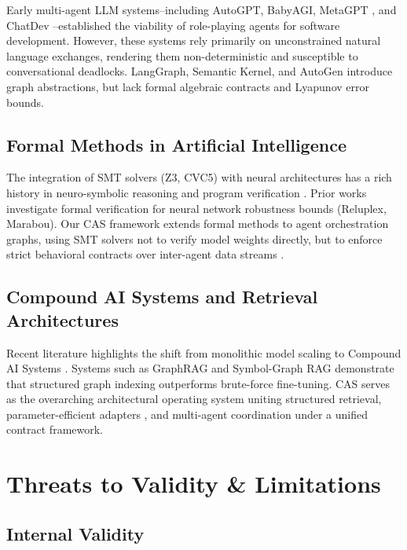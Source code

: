 \documentclass[10pt,twocolumn,letterpaper]{article}
\begin{document}
Early multi-agent LLM systems--including AutoGPT, BabyAGI, MetaGPT \cite{crossref_10_48550_arxiv_2308_00352}, and ChatDev \cite{crossref_10_18653_v1_2024_acl_long_810}--established the viability of role-playing agents for software development. However, these systems rely primarily on unconstrained natural language exchanges, rendering them non-deterministic and susceptible to conversational deadlocks. LangGraph, Semantic Kernel, and AutoGen introduce graph abstractions, but lack formal algebraic contracts and Lyapunov error bounds.


\subsection{Formal Methods in Artificial Intelligence}

The integration of SMT solvers (Z3, CVC5) with neural architectures has a rich history in neuro-symbolic reasoning and program verification \cite{crossref_10_18653_v1_2026_findings_acl_1933}. Prior works investigate formal verification for neural network robustness bounds (Reluplex, Marabou). Our CAS framework extends formal methods to agent orchestration graphs, using SMT solvers not to verify model weights directly, but to enforce strict behavioral contracts over inter-agent data streams \cite{arxiv_2404_01131}.


\subsection{Compound AI Systems and Retrieval Architectures}

Recent literature highlights the shift from monolithic model scaling to Compound AI Systems \cite{arxiv_2406_00584,arxiv_2005_14165}. Systems such as GraphRAG \cite{arxiv_2501_14050} and Symbol-Graph RAG demonstrate that structured graph indexing outperforms brute-force fine-tuning. CAS serves as the overarching architectural operating system uniting structured retrieval, parameter-efficient adapters \cite{arxiv_2305_18290}, and multi-agent coordination under a unified contract framework.




\section{Threats to Validity \& Limitations}



\subsection{Internal Validity}
\end{document}

